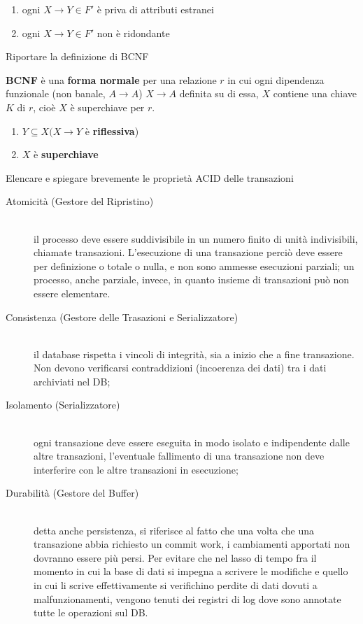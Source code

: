\documentclass{exam}
\begin{document}
\begin{questions}
\begin{solution}
\begin{enumerate}
            \item ogni $X \rightarrow Y \in F'$ è priva di attributi estranei 
            \item ogni $X \rightarrow Y \in F'$ non è ridondante
        \end{enumerate} 
    \end{solution}
    \question Riportare la definizione di BCNF
    \begin{solution}
        \textbf{BCNF} è una \textbf{forma normale} per una relazione $r$ in cui ogni dipendenza funzionale (non banale, $A \rightarrow A$)
        $X \rightarrow A$ definita su di essa, $X$ contiene una chiave $K$ di $r$, cioè $X$ è superchiave per $r$.
        \begin{enumerate}
            \item $Y \subseteq X (X \rightarrow Y$ è \textbf{riflessiva})
            \item $X$ è \textbf{superchiave}
        \end{enumerate}
    \end{solution}
    \question Elencare e spiegare brevemente le proprietà ACID delle transazioni
    \begin{solution}
        \begin{description}
            \item[Atomicità (Gestore del Ripristino)] \hfill \\ il processo deve essere suddivisibile in un numero finito di unità indivisibili, chiamate transazioni. L'esecuzione di una transazione perciò deve essere per definizione o totale o nulla, e non sono ammesse esecuzioni parziali; un processo, anche parziale, invece, in quanto insieme di transazioni può non essere elementare.
            \item[Consistenza (Gestore delle Trasazioni e Serializzatore)] \hfill \\ il database rispetta i vincoli di integrità, sia a inizio che a fine transazione. Non devono verificarsi contraddizioni (incoerenza dei dati) tra i dati archiviati nel DB;
            \item[Isolamento (Serializzatore)] \hfill \\ ogni transazione deve essere eseguita in modo isolato e indipendente dalle altre transazioni, l'eventuale fallimento di una transazione non deve interferire con le altre transazioni in esecuzione;
            \item[Durabilità (Gestore del Buffer)] \hfill \\ detta anche persistenza, si riferisce al fatto che una volta che una transazione abbia richiesto un commit work, i cambiamenti apportati non dovranno essere più persi. Per evitare che nel lasso di tempo fra il momento in cui la base di dati si impegna a scrivere le modifiche e quello in cui li scrive effettivamente si verifichino perdite di dati dovuti a malfunzionamenti, vengono tenuti dei registri di log dove sono annotate tutte le operazioni sul DB.

\end{description}
\end{solution}
\end{questions}
\end{document}
